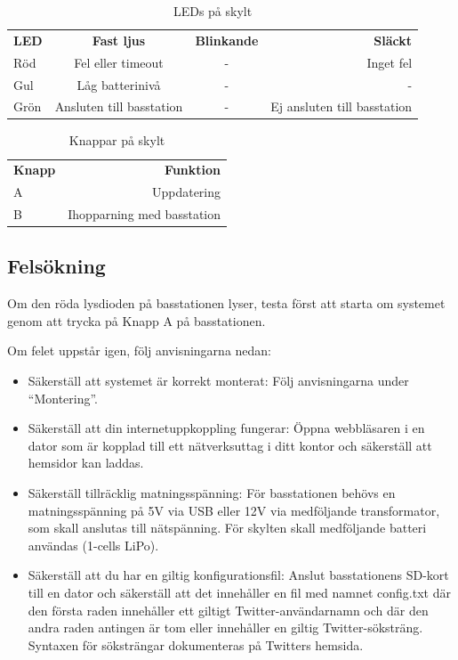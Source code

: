 \documentclass[a4paper,11pt]{article}
\begin{document}
\begin{table}[h!]
\centering
    \begin{tabular}{|l|c|c|r|}
    {\bf LED} & {\bf Fast ljus} & {\bf Blinkande} & {\bf Släckt} \\
    Röd & Fel eller timeout & - & Inget fel \\
    Gul & Låg batterinivå & - & - \\
    Grön & Ansluten till basstation & - & Ej ansluten till basstation\\
    \end{tabular}
\caption{LEDs på skylt}
\label{tab:ledtable_skylt}
\end{table}

\begin{table}[h!]
\centering
    \begin{tabular}{|l|r|}
    {\bf Knapp} & {\bf Funktion} \\
    A & Uppdatering \\
    B & Ihopparning med basstation \\
    \end{tabular}
\caption{Knappar på skylt}
\label{tab:btntable_skylt}
\end{table}

\subsection{Felsökning}

Om den röda lysdioden på basstationen lyser, testa först att starta om systemet genom att trycka på Knapp A på basstationen.

Om felet uppstår igen, följ anvisningarna nedan:
\begin{itemize}
\item Säkerställ att systemet är korrekt monterat: Följ anvisningarna under “Montering”.
\item Säkerställ att din internetuppkoppling fungerar: Öppna webbläsaren i en dator som är kopplad till ett nätverksuttag i ditt kontor och säkerställ att hemsidor kan laddas.
\item Säkerställ tillräcklig matningsspänning: För basstationen behövs en matningsspänning på 5V via USB eller 12V via medföljande transformator, som skall anslutas till nätspänning. För skylten skall medföljande batteri användas (1-cells LiPo).
\item Säkerställ att du har en giltig konfigurationsfil: Anslut basstationens SD-kort till en dator och säkerställ att det innehåller en fil med namnet config.txt där den första raden innehåller ett giltigt Twitter-användarnamn och där den andra raden antingen är tom eller innehåller en giltig Twitter-söksträng. Syntaxen för söksträngar dokumenteras på Twitters hemsida.
\end{itemize}
\end{document}

